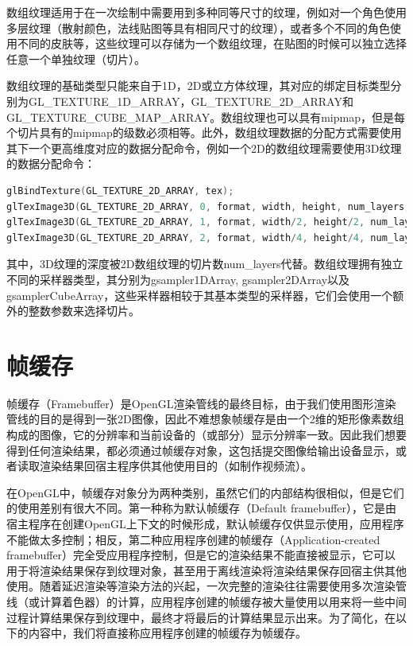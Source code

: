 数组纹理适用于在一次绘制中需要用到多种同等尺寸的纹理，例如对一个角色使用多层纹理（散射颜色，法线贴图等具有相同尺寸的纹理），或者多个不同的角色使用不同的皮肤等，这些纹理可以存储为一个数组纹理，在贴图的时候可以独立选择任意一个单独纹理（切片）。

数组纹理的基础类型只能来自于1D，2D或立方体纹理，其对应的绑定目标类型分别为GL\_TEXTURE\_1D\_ARRAY，GL\_TEXTURE\_2D\_ARRAY和GL\_TEXTURE\_CUBE\_MAP\_ARRAY。数组纹理也可以具有mipmap，但是每个切片具有的mipmap的级数必须相等。此外，数组纹理数据的分配方式需要使用其下一个更高维度对应的数据分配命令，例如一个2D的数组纹理需要使用3D纹理的数据分配命令：


\begin{lstlisting}[language=C++]
glBindTexture(GL_TEXTURE_2D_ARRAY, tex);
glTexImage3D(GL_TEXTURE_2D_ARRAY, 0, format, width, height, num_layers, ...);
glTexImage3D(GL_TEXTURE_2D_ARRAY, 1, format, width/2, height/2, num_layers, ...);
glTexImage3D(GL_TEXTURE_2D_ARRAY, 2, format, width/4, height/4, num_layers, ...);
\end{lstlisting}

其中，3D纹理的深度被2D数组纹理的切片数num\_layers代替。数组纹理拥有独立不同的采样器类型，其分别为gsampler1DArray​, gsampler2DArray​以及gsamplerCubeArray，这些采样器相较于其基本类型的采样器，它们会使用一个额外的整数参数来选择切片。​





\section{帧缓存}\label{sec:api-framebuffer}
帧缓存（Framebuffer）是OpenGL渲染管线的最终目标，由于我们使用图形渲染管线的目的是得到一张2D图像，因此不难想象帧缓存是由一个2维的矩形像素数组构成的图像，它的分辨率和当前设备的（或部分）显示分辨率一致。因此我们想要得到任何渲染结果，都必须通过帧缓存对象，这包括提交图像给输出设备显示，或者读取渲染结果回宿主程序供其他使用目的（如制作视频流）。

在OpenGL中，帧缓存对象分为两种类别，虽然它们的内部结构很相似，但是它们的使用差别有很大不同。第一种称为默认帧缓存（Default framebuffer），它是由宿主程序在创建OpenGL上下文的时候形成，默认帧缓存仅供显示使用，应用程序不能做太多控制；相反，第二种应用程序创建的帧缓存（Application-created framebuffer）完全受应用程序控制，但是它的渲染结果不能直接被显示，它可以用于将渲染结果保存到纹理对象，甚至用于离线渲染将渲染结果保存回宿主供其他使用。随着延迟渲染等渲染方法的兴起，一次完整的渲染往往需要使用多次渲染管线（或计算着色器）的计算，应用程序创建的帧缓存被大量使用以用来将一些中间过程计算结果保存到纹理中，最终才将最后的计算结果显示出来。为了简化，在以下的内容中，我们将直接称应用程序创建的帧缓存为帧缓存。

